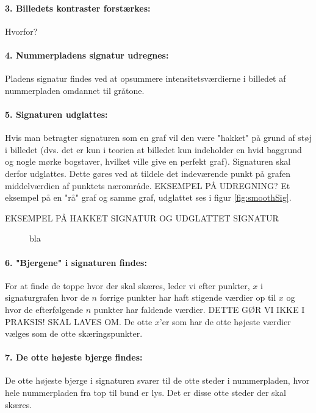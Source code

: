 \paragraph{3. Billedets kontraster forstærkes:}
Hvorfor?

\paragraph{4. Nummerpladens signatur udregnes:}
Pladens signatur findes ved at opsummere intensitetsværdierne i billedet af nummerpladen omdannet til gråtone.

\paragraph{5. Signaturen udglattes:}
Hvis man betragter signaturen som en graf vil den være "hakket" på grund af støj i billedet (dvs. det er kun i teorien at billedet kun indeholder en hvid baggrund og nogle mørke bogstaver, hvilket ville give en perfekt graf). Signaturen skal derfor udglattes. Dette gøres ved at tildele det indeværende punkt på grafen middelværdien af punktets nærområde. EKSEMPEL PÅ UDREGNING? Et eksempel på en "rå" graf og samme graf, udglattet ses i figur \vref{fig:smoothSig}.

EKSEMPEL PÅ HAKKET SIGNATUR OG UDGLATTET SIGNATUR

\begin{figure}[htp]
\label{fig:smoothSig}
\caption{bla}
\end{figure}

\paragraph{6. "Bjergene" i signaturen findes:}
For at finde de toppe hvor der skal skæres, leder vi efter punkter, $x$ i signaturgrafen hvor de $n$ forrige punkter har haft stigende værdier op til $x$ og hvor de efterfølgende $n$ punkter har faldende værdier. DETTE GØR VI IKKE I PRAKSIS! SKAL LAVES OM. De otte $x$'er som har de otte højeste værdier vælges som de otte skæringspunkter.

\paragraph{7. De otte højeste bjerge findes:}
De otte højeste bjerge i signaturen svarer til de otte steder i nummerpladen, hvor hele nummerpladen fra top til bund er lys. Det er disse otte steder der skal skæres.


